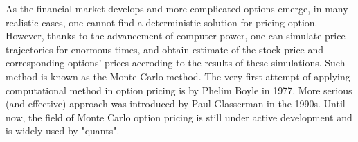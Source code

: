 
As the financial market develops and more complicated options emerge, in many realistic cases, one cannot find a deterministic solution for pricing option. However, thanks to the advancement of computer power, one can simulate price trajectories for enormous times, and obtain estimate of the stock price and corresponding options' prices accroding to the results of these simulations. Such method is known as the Monte Carlo method. The very first attempt of applying computational method in option pricing is by Phelim Boyle in 1977. More serious (and effective) approach was introduced by Paul Glasserman \cite{Glasserman2003} in the 1990s. Until now, the field of Monte Carlo option pricing is still under active development and is widely used by "quants".

\newpage